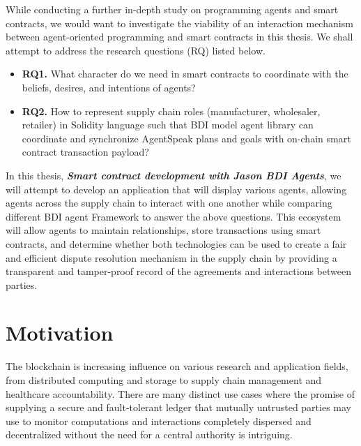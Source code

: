 \vspace{.5cm}
While conducting a further in-depth study on programming agents and smart contracts, we would want to investigate the viability of an interaction mechanism between agent-oriented programming and smart contracts in this thesis. We shall attempt to address the research questions (RQ) listed below.
\begin{itemize}[label={}]

\item \textbf{RQ1.} What character do we need in smart contracts to coordinate with the beliefs, desires, and intentions of agents? \\

 \item \textbf{RQ2.} How to represent supply chain roles (manufacturer, wholesaler, retailer) in Solidity language such that \ac{BDI} model agent library can coordinate and synchronize AgentSpeak plans and goals with on-chain smart contract transaction payload? \\
 
 
\end{itemize}

In this thesis, \textbf{\textit{Smart contract development with Jason \ac{BDI} Agents}}, we will attempt to develop an application that will display various agents, allowing agents across the supply chain to interact with one another while comparing different \ac{BDI} agent Framework to answer the above questions. This ecosystem will allow agents to maintain relationships, store transactions using smart contracts, and determine whether both technologies can be used to create a fair and efficient dispute resolution mechanism in the supply chain by providing a transparent and tamper-proof record of the agreements and interactions between parties.

\section{Motivation}

The blockchain is increasing influence on various research and application fields, from distributed computing and storage to supply chain management and healthcare accountability. There are many distinct use cases where the promise of supplying a secure and fault-tolerant ledger that mutually untrusted parties may use to monitor computations and interactions completely dispersed and decentralized without the need for a central authority is intriguing. 

